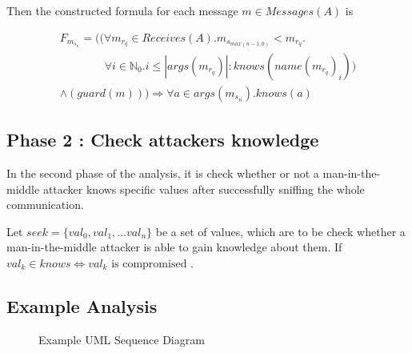 \documentclass[12pt,journal,compsoc]{IEEEtran}
\newcommand{\MITMA}[0]{man-in-the-middle attacker }
\newcommand{\knowsname}[0]{knows}
\newcommand{\knows}[1]{\knowsname (#1)}
\newcommand{\inknows}[1]{#1 \in \knowsname}
\newcommand{\linesep}[0]{\newline}
\begin{document}
Then the constructed formula for each message $m \in Messages(A)$ is
%
\begin{small}
\begin{multline*}
	F_{m_{s_n}} = (
 		(\forall m_{r_q} \in Receives(A) . m_{s_{max(n-1,0)}} < m_{r_q} . \\ 
 		\hspace{4em} \forall i \in \mathbb{N}_0 . i \leq |args(m_{r_q})| : \knows{name(m_{r_q})_i}) \\
 		\wedge 
 		(guard(m))
 	)
 	\Rightarrow
	\forall a \in args(m_{s_n}) . \knows{a}
\end{multline*}
\end{small}

\subsection{Phase 2 : Check attackers knowledge}

In the second phase of the analysis, it is check whether or not a \MITMA 
knows specific values after successfully sniffing the whole communication.
\linesep

Let $seek = \{ val_0 , val_1 , ... val_n \}$ be a set of values, which are to be check whether a \MITMA is able 
to gain knowledge about them. If $\inknows{val_k} \Leftrightarrow val_k \text{ is compromised }$.

\subsection{Example Analysis}

\begin{figure}[!t]
	\centering
	\caption{Example UML Sequence Diagram}
	\label{fig:ExampleAnalysisGraphic}
\end{figure}
\end{document}
